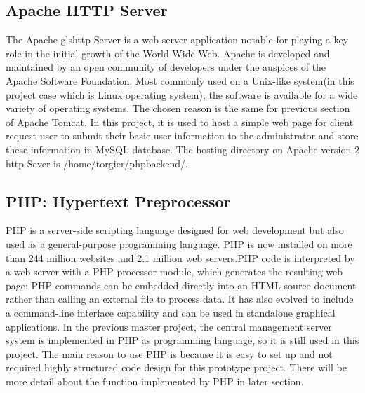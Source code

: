 \subsection{Apache HTTP Server}
\par The Apache gls{http} Server is a web server application notable for playing a key role in the initial growth of the World Wide Web. Apache is developed and maintained by an open community of developers under the auspices of the Apache Software Foundation. Most commonly used on a Unix-like system(in this project case which is Linux operating system), the software is available for a wide variety of operating systems. The chosen reason is the same for previous section of Apache Tomcat. In this project, it is used to host a simple web page for client request user to submit their basic user information to the administrator and store these information in MySQL\cite{mysql} database. The hosting directory on Apache version 2 \gls{http} Sever is /home/torgier/phpbackend/.

\subsection{PHP: Hypertext Preprocessor}
\par PHP is a server-side scripting language designed for web development but also used as a general-purpose programming language. PHP is now installed on more than 244 million websites and 2.1 million web servers.PHP code is interpreted by a web server with a PHP processor module, which generates the resulting web page: PHP commands can be embedded directly into an HTML source document rather than calling an external file to process data. It has also evolved to include a command-line interface capability and can be used in standalone graphical applications. In the previous master project, the central management server system is implemented in PHP as programming language, so it is still used in this project. The main reason to use PHP is because it is easy to set up and not required highly structured code design for this prototype project. There will be more detail about the function implemented by PHP in later section.

